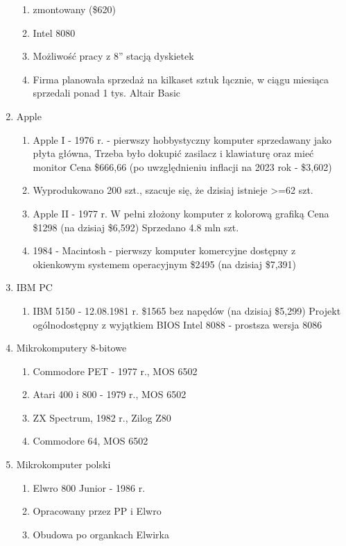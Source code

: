 \documentclass[a4paper,twoside,onecolumn]{report}
\begin{document}
\begin{enumerate}[-]
\begin{enumerate}[*]
					\item zmontowany (\$620)
					\item Intel 8080
					\item Możliwość pracy z 8” stacją dyskietek
					\item Firma planowała sprzedaż na kilkaset sztuk łącznie, w ciągu miesiąca sprzedali ponad 1 tys. Altair Basic
				\end{enumerate}
			\item Apple
				\begin{enumerate}[*]
					\item Apple I - 1976 r. - pierwszy hobbystyczny komputer sprzedawany jako płyta główna, Trzeba było dokupić zasilacz i klawiaturę oraz mieć monitor Cena 								\$666,66 (po uwzględnieniu inflacji na 2023 rok - \$3,602)
					\item Wyprodukowano 200 szt., szacuje się, że dzisiaj istnieje >=62 szt.
					\item Apple II - 1977 r. W pełni złożony komputer z kolorową grafiką Cena \$1298 (na dzisiaj \$6,592) Sprzedano 4.8 mln szt. 
					\item 1984 - Macintosh - pierwszy komputer komercyjne dostępny z okienkowym systemem operacyjnym \$2495 (na dzisiaj \$7,391)
				\end{enumerate}
			\item IBM PC
				\begin{enumerate}[*]
					\item IBM 5150 - 12.08.1981 r. \$1565 bez napędów (na dzisiaj \$5,299) Projekt ogólnodostępny z wyjątkiem BIOS Intel 8088 - prostsza wersja 8086
				\end{enumerate}
			\item Mikrokomputery 8-bitowe
				\begin{enumerate}[*]
					\item Commodore PET - 1977 r., MOS 6502
					\item Atari 400 i 800 - 1979 r., MOS 6502
					\item ZX Spectrum, 1982 r., Zilog Z80
					\item Commodore 64, MOS 6502
				\end{enumerate}
			\item Mikrokomputer polski
				\begin{enumerate}[*]
					\item Elwro 800 Junior - 1986 r.
					\item Opracowany przez PP i Elwro
					\item Obudowa po organkach Elwirka

\end{enumerate}
\end{enumerate}
\end{document}

